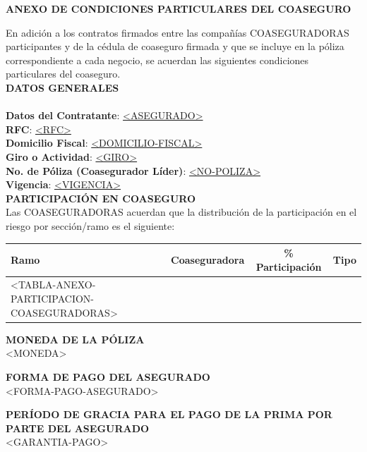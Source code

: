 ﻿\documentclass[letterpaper,10pt]{article}
\begin{document}
\begin{center}
    \textbf{ANEXO DE CONDICIONES PARTICULARES DEL COASEGURO}
\end{center}

En adición a los contratos firmados entre las compañías COASEGURADORAS participantes y de la cédula de coaseguro firmada y que se incluye en la póliza correspondiente a cada negocio, se acuerdan las siguientes condiciones particulares del coaseguro.\\


\textbf{DATOS GENERALES}\\\\
\textbf{Datos del Contratante}: \underline{<ASEGURADO>}\\
\textbf{RFC}: \underline{<RFC>}\\
\textbf{Domicilio Fiscal}: \ul{<DOMICILIO-FISCAL>}\\
\textbf{Giro o Actividad}: \ul{<GIRO>}\\
\textbf{No. de Póliza (Coasegurador Líder)}: \underline{<NO-POLIZA>}\\
\textbf{Vigencia}: \underline{<VIGENCIA>}\\

\textbf{PARTICIPACIÓN EN COASEGURO}\\

Las COASEGURADORAS acuerdan que la distribución de la participación en el riesgo por sección/ramo es el siguiente:

\begin{center}
    \begin{tabularx}{\textwidth}{|X|c|c|c|}
        \hline
        \textbf{Ramo} & \textbf{Coaseguradora} & \textbf{\% Participación} & \textbf{Tipo}\\\hline
        <TABLA-ANEXO-PARTICIPACION-COASEGURADORAS>
    \end{tabularx}
\end{center}

\textbf{MONEDA DE LA PÓLIZA}\\

<MONEDA>

\textbf{FORMA DE PAGO DEL ASEGURADO}\\

<FORMA-PAGO-ASEGURADO>

\textbf{PERÍODO DE GRACIA PARA EL PAGO DE LA PRIMA POR PARTE DEL ASEGURADO}\\

<GARANTIA-PAGO>
\end{document}
